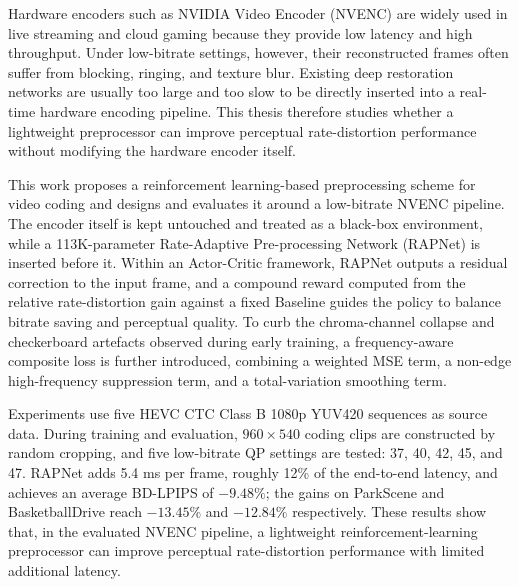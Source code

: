
Hardware encoders such as NVIDIA Video Encoder (NVENC) are widely used in live streaming and cloud gaming because they provide low latency and high throughput. Under low-bitrate settings, however, their reconstructed frames often suffer from blocking, ringing, and texture blur. Existing deep restoration networks are usually too large and too slow to be directly inserted into a real-time hardware encoding pipeline. This thesis therefore studies whether a lightweight preprocessor can improve perceptual rate-distortion performance without modifying the hardware encoder itself.

This work proposes a reinforcement learning-based preprocessing scheme for video coding and designs and evaluates it around a low-bitrate NVENC pipeline. The encoder itself is kept untouched and treated as a black-box environment, while a 113K-parameter Rate-Adaptive Pre-processing Network (RAPNet) is inserted before it. Within an Actor-Critic framework, RAPNet outputs a residual correction to the input frame, and a compound reward computed from the relative rate-distortion gain against a fixed Baseline guides the policy to balance bitrate saving and perceptual quality. To curb the chroma-channel collapse and checkerboard artefacts observed during early training, a frequency-aware composite loss is further introduced, combining a weighted MSE term, a non-edge high-frequency suppression term, and a total-variation smoothing term.

Experiments use five HEVC CTC Class B 1080p YUV420 sequences as source data. During training and evaluation, $960\times540$ coding clips are constructed by random cropping, and five low-bitrate QP settings are tested: 37, 40, 42, 45, and 47. RAPNet adds 5.4 ms per frame, roughly 12\% of the end-to-end latency, and achieves an average BD-LPIPS of $-9.48\%$; the gains on ParkScene and BasketballDrive reach $-13.45\%$ and $-12.84\%$ respectively. These results show that, in the evaluated NVENC pipeline, a lightweight reinforcement-learning preprocessor can improve perceptual rate-distortion performance with limited additional latency.

